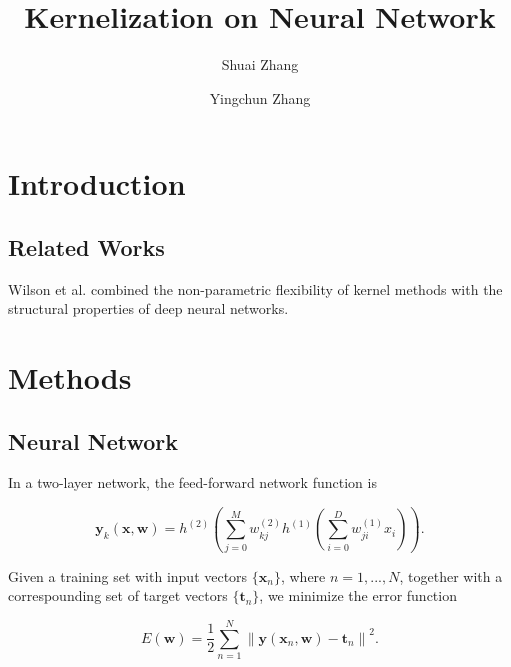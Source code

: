 \documentclass{article}
\begin{document}
\title{Kernelization on Neural Network}
\author{Shuai Zhang\and Yingchun Zhang}
\maketitle


\section{Introduction}

\subsection{Related Works}
Wilson et al. \cite{DBLP:journals/corr/WilsonHSX15} combined the non-parametric flexibility of kernel methods with the structural properties of deep neural networks.




\section{Methods}

\subsection{Neural Network}

In a two-layer network, the feed-forward network function is

\begin{equation}
\mathbf{y}_k(\mathbf{x}, \mathbf{w}) = h^{(2)}\left(\sum_{j=0}^{M}w_{kj}^{(2)}h^{(1)}\left(\sum_{i=0}^{D}w_{ji}^{(1)}x_i\right)\right).
\end{equation}

Given a training set with input vectors $\{\mathbf{x}_n\}$, where $n = 1, ..., N$, together with a correspounding set of target vectors $\{\mathbf{t}_n\}$, we minimize the error function

\begin{equation}
E(\mathbf{w}) = \frac{1}{2} \sum_{n=1}^{N} {\|\mathbf{y}(\mathbf{x}_n, \mathbf{w}) - \mathbf{t}_n\|}^2.
\end{equation}




\end{document}
